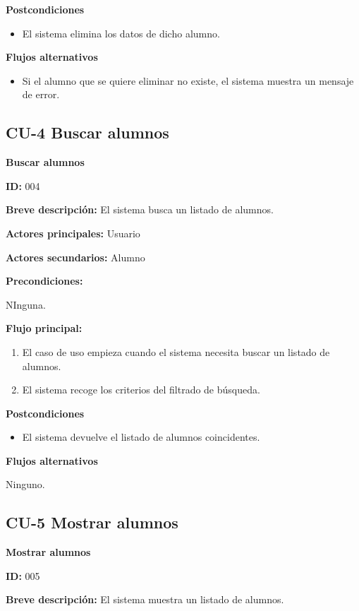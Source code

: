 \textbf{Postcondiciones}

\begin{itemize}
	\item El sistema elimina los datos de dicho alumno.
\end{itemize}

\textbf{Flujos alternativos}

\begin{itemize}
	\item Si el alumno que se quiere eliminar no existe, el sistema muestra un mensaje de error.
\end{itemize}

\subsection{CU-4 Buscar alumnos}
\textbf{Buscar alumnos}

\textbf{ID:} 004

\textbf{Breve descripción:} El sistema busca un listado de alumnos.

\textbf{Actores principales:} Usuario

\textbf{Actores secundarios:} Alumno

\textbf{Precondiciones:}

NInguna.

\textbf{Flujo principal:}

\begin{enumerate}
	\item El caso de uso empieza cuando el sistema necesita buscar un listado de alumnos.
	\item El sistema recoge los criterios del filtrado de búsqueda.
\end{enumerate}

\textbf{Postcondiciones}

\begin{itemize}
	\item El sistema devuelve el listado de alumnos coincidentes.
\end{itemize}

\textbf{Flujos alternativos}

Ninguno.

\subsection{CU-5 Mostrar alumnos}
\textbf{Mostrar alumnos}

\textbf{ID:} 005

\textbf{Breve descripción:} El sistema muestra un listado de alumnos.

